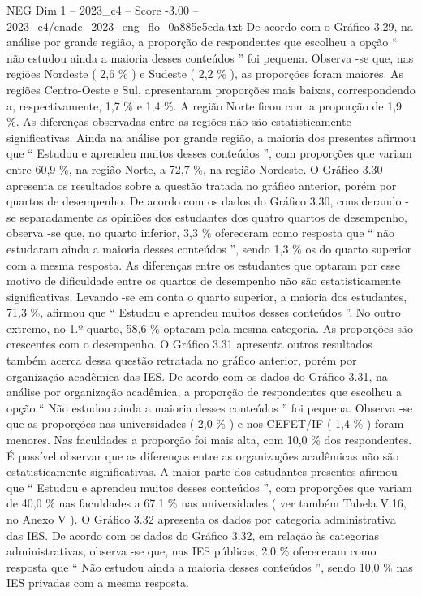 \begin{textsample}{NEG Dim 1 – 2023\_c4 – Score -3.00 – 2023\_c4/enade\_2023\_eng\_flo\_0a885c5cda.txt}
De acordo com o Gráfico 3.29, na análise por grande região, a proporção de respondentes que escolheu a opção “ não estudou ainda a maioria desses conteúdos ” foi pequena.
Observa -se que, nas regiões Nordeste ( 2,6 \% ) e Sudeste ( 2,2 \% ), as proporções foram maiores.
As regiões Centro-Oeste e Sul, apresentaram proporções mais baixas, correspondendo a, respectivamente, 1,7 \% e 1,4 \%.
A região Norte ficou com a proporção de 1,9 \%.
As diferenças observadas entre as regiões não são estatisticamente significativas.
Ainda na análise por grande região, a maioria dos presentes afirmou que “ Estudou e aprendeu muitos desses conteúdos ”, com proporções que variam entre 60,9 \%, na região Norte, a 72,7 \%, na região Nordeste.
O Gráfico 3.30 apresenta os resultados sobre a questão tratada no gráfico anterior, porém por quartos de desempenho.
De acordo com os dados do Gráfico 3.30, considerando -se separadamente as opiniões dos estudantes dos quatro quartos de desempenho, observa -se que, no quarto inferior, 3,3 \% ofereceram como resposta que “ não estudaram ainda a maioria desses conteúdos ”, sendo 1,3 \% os do quarto superior com a mesma resposta.
As diferenças entre os estudantes que optaram por esse motivo de dificuldade entre os quartos de desempenho não são estatisticamente significativas.
Levando -se em conta o quarto superior, a maioria dos estudantes, 71,3 \%, afirmou que “ Estudou e aprendeu muitos desses conteúdos ”.
No outro extremo, no 1.º quarto, 58,6 \% optaram pela mesma categoria.
As proporções são crescentes com o desempenho.
O Gráfico 3.31 apresenta outros resultados também acerca dessa questão retratada no gráfico anterior, porém por organização acadêmica das IES.
De acordo com os dados do Gráfico 3.31, na análise por organização acadêmica, a proporção de respondentes que escolheu a opção “ Não estudou ainda a maioria desses conteúdos ” foi pequena.
Observa -se que as proporções nas universidades ( 2,0 \% ) e nos CEFET/IF ( 1,4 \% ) foram menores.
Nas faculdades a proporção foi mais alta, com 10,0 \% dos respondentes.
É possível observar que as diferenças entre as organizações acadêmicas não são estatisticamente significativas.
A maior parte dos estudantes presentes afirmou que “ Estudou e aprendeu muitos desses conteúdos ”, com proporções que variam de 40,0 \% nas faculdades a 67,1 \% nas universidades ( ver também Tabela V.16, no Anexo V ).
O Gráfico 3.32 apresenta os dados por categoria administrativa das IES.
De acordo com os dados do Gráfico 3.32, em relação às categorias administrativas, observa -se que, nas IES públicas, 2,0 \% ofereceram como resposta que “ Não estudou ainda a maioria desses conteúdos ”, sendo 10,0 \% nas IES privadas com a mesma resposta.

\end{textsample}
